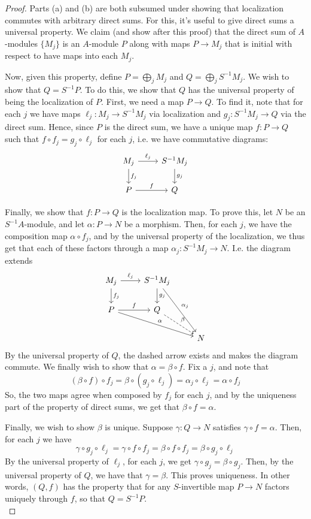 \documentclass[12pt]{exam}
\begin{document}
\begin{proof}
	Parts (a) and (b) are both subsumed under showing that localization commutes with arbitrary direct sums. For this, it's useful to give direct sums a universal property. We claim (and show after this proof) that the direct sum of $A$-modules $\{M_j\}$ is an $A$-module $P$ along with maps $P \to M_j$ that is initial with respect to have maps into each $M_j$.
	
	Now, given this property, define $P = \bigoplus_j M_j$ and $Q = \bigoplus_j S^{-1}M_j$. We wish to show that $Q = S^{-1}P$. To do this, we show that $Q$ has the universal property of being the localization of $P$. First, we need a map $P \to Q$. To find it, note that for each $j$ we have maps $\ell_j : M_j \to S^{-1}M_j$ via localization and $g_j : S^{-1}M_j \to Q$ via the direct sum. Hence, since $P$ is the direct sum, we have a unique map $f : P \to Q$ such that $f \circ f_j = g_j \circ \ell_j$ for each $j$, i.e. we have commutative diagrams:
	\[ \begin{tikzcd} M_j \arrow{r}{\ell_j} \arrow{d}{f_j} & S^{-1}M_j \arrow{d}{g_j} \\ P \arrow{r}{f} & Q \end{tikzcd} \]
	
	Finally, we show that $f : P \to Q$ is the localization map. To prove this, let $N$ be an $S^{-1}A$-module, and let $\alpha : P \to N$ be a morphism. Then, for each $j$, we have the composition map $\alpha \circ f_j$, and by the universal property of the localization, we thus get that each of these factors through a map $\alpha_j : S^{-1}M_j \to N$. I.e. the diagram extends
	\[ \begin{tikzcd} M_j \arrow{r}{\ell_j} \arrow{d}{f_j} & S^{-1}M_j \arrow{d}{g_j} \arrow{ddr}{\alpha_j} \\ P \arrow{r}{f} \arrow{drr}{\alpha} & Q \arrow[dashed]{dr}{\beta} \\ & & N \end{tikzcd} \]
	By the universal property of $Q$, the dashed arrow exists and makes the diagram commute. We finally wish to show that $\alpha = \beta \circ f$. Fix a $j$, and note that
	\[ (\beta \circ f) \circ f_j = \beta \circ (g_j \circ \ell_j) = \alpha_j \circ \ell_j = \alpha \circ f_j \]
	So, the two maps agree when composed by $f_j$ for each $j$, and by the uniqueness part of the property of direct sums, we get that $\beta \circ f = \alpha$.
	
	Finally, we wish to show $\beta$ is unique. Suppose $\gamma : Q \to N$ satisfies $\gamma \circ f = \alpha$. Then, for each $j$ we have
	\[ \gamma \circ g_j \circ \ell_j = \gamma \circ f \circ f_j = \beta \circ f \circ f_j = \beta \circ g_j \circ \ell_j \]
	By the universal property of $\ell_j$, for each $j$, we get $\gamma \circ g_j = \beta \circ g_j$. Then, by the universal property of $Q$, we have that $\gamma = \beta$. This proves uniqueness. In other words, $(Q,f)$ has the property that for any $S$-invertible map $P \to N$ factors uniquely through $f$, so that $Q = S^{-1}P$. \\
	

\end{proof}
\end{document}
